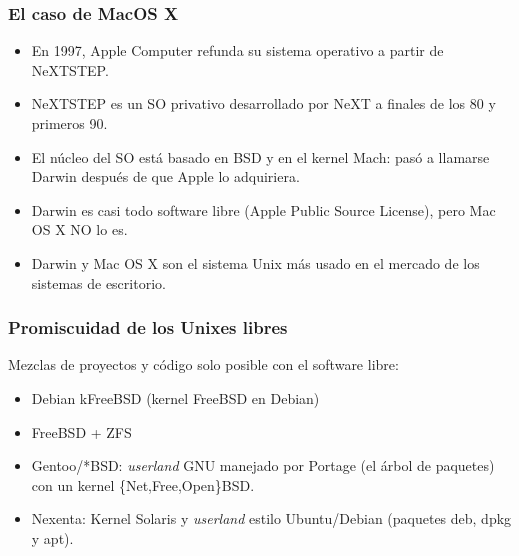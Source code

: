 \documentclass{beamer}
\begin{document}

\begin{frame}
\frametitle{El caso de MacOS X}

\begin{itemize}

\item En 1997, Apple Computer refunda su sistema operativo a partir de NeXTSTEP. 
\item NeXTSTEP es un SO privativo desarrollado por NeXT a finales de los 80 y primeros 90. 
\item El núcleo del SO está basado en BSD y en el kernel Mach: pasó a llamarse Darwin después de que Apple lo adquiriera. 
\item Darwin es casi todo software libre (Apple Public Source License), pero Mac OS X \alert{NO} lo es.
\item Darwin y Mac OS X son el sistema Unix más usado en el mercado de los sistemas de escritorio. 

\end{itemize}

\end{frame}



\begin{frame}
\frametitle{Promiscuidad de los Unixes libres}

Mezclas de proyectos y código \alert{solo} posible con el software libre:

\begin{itemize}

\item Debian kFreeBSD (kernel FreeBSD en Debian)
\item FreeBSD + ZFS
\item Gentoo/*BSD: \textit{userland} GNU manejado por Portage (el árbol de paquetes) con un kernel \{Net,Free,Open\}BSD.
\item Nexenta: Kernel Solaris y \textit{userland} estilo Ubuntu/Debian (paquetes deb, dpkg y apt).

\end{itemize}

\end{frame}

\end{document}
